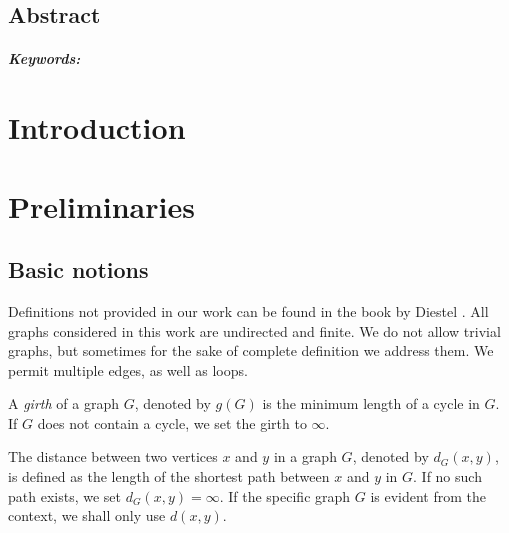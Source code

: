 \documentclass[12pt, twoside]{book}
\begin{document}
\newpage

\begin{otherlanguage}{USenglish}
    \section*{Abstract}

    \thesisabstracten{}

    \paragraph*{Keywords:} \thesiskeywordsen{}
\end{otherlanguage}

\newpage
\tableofcontents

\newpage
\listoffigures

\mainmatter{}

\chapter*{Introduction}

\chapter{Preliminaries}\label{ch:preliminaries}

\section{Basic notions}

Definitions not provided in our work can be found in the book  by Diestel \cite{Diestel}. All graphs considered in this work are undirected and finite. We do not allow trivial graphs, but sometimes for the sake of complete definition we address them. We permit multiple edges, as well as loops.

A \textit{girth} of a graph $G$, denoted by $g(G)$ is the minimum length of a cycle in $G$. If $G$ does not contain a cycle, we set the girth to $\infty$.

The distance between two vertices $x$ and $y$ in a graph $G$, denoted by $d_G(x,y)$, is defined as the length of the shortest path between $x$ and $y$ in $G$. If no such path exists, we set $d_G(x,y)=\infty$. If the specific graph $G$ is evident from the context, we shall only use $d(x,y)$.
\end{document}
